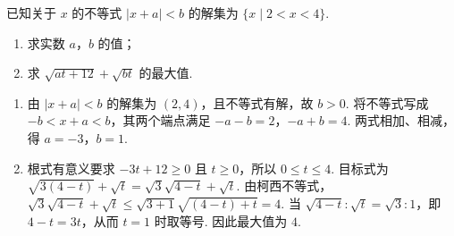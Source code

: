 \begin{problem}
已知关于 \(x\) 的不等式 \(|x + a| < b\) 的解集为 \(\{x \mid 2 < x < 4\}\).

\begin{enumerate}
\item 求实数 \(a\)，\(b\) 的值；
\item 求 \( \sqrt{at+12}+\sqrt{bt} \) 的最大值.
\end{enumerate}
\end{problem}

\begin{solution}
\begin{enumerate}
\item 由 \(|x+a|<b\) 的解集为 \((2,4)\)，且不等式有解，故 \(b>0\). 将不等式写成
\(-b<x+a<b\)，其两个端点满足 \(-a-b=2\)，\(-a+b=4\). 两式相加、相减，得 \(a=-3\)，\(b=1\).

\item 根式有意义要求 \(-3t+12\geqslant0\) 且 \(t\geqslant0\)，所以 \(0\leqslant t\leqslant4\). 目标式为
\(\sqrt{3(4-t)}+\sqrt{t}=\sqrt{3}\sqrt{4-t}+\sqrt{t}\).
由柯西不等式，
\(\sqrt{3}\sqrt{4-t}+\sqrt{t}\leqslant\sqrt{3+1}\sqrt{(4-t)+t}=4\).
当 \(\sqrt{4-t}:\sqrt{t}=\sqrt{3}:1\)，即 \(4-t=3t\)，从而 \(t=1\) 时取等号. 因此最大值为 \(4\).
\end{enumerate}
\end{solution}
